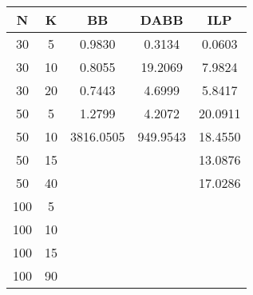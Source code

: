 \begin{center}
\begin{tabular}{|c|c||c|c|c|}
	\hline 
	  N & K  & BB		& DABB 		& ILP    \\
	 \hline
	 30 &  5 &    0.9830 &    0.3134 &   0.0603 \\
	 30 & 10 &    0.8055 &   19.2069 &   7.9824 \\
	 30 & 20 &    0.7443 &    4.6999 &   5.8417 \\
	\hline
	 50 &  5 &    1.2799 &    4.2072 &  20.0911 \\
	 50 & 10 & 3816.0505 &  949.9543 &  18.4550 \\
	 50 & 15 &    &    &  13.0876 \\
	 50 & 40 &    &    &  17.0286 \\
	\hline
	100 &  5 &    &    & \\
	100 & 10 &    &    & \\
	100 & 15 &    &    & \\
	100 & 90 &    &    & \\
	\hline
\end{tabular}
\end{center}